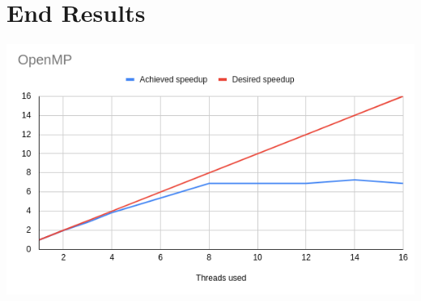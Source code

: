 \documentclass{report}
\begin{document}
\section{End Results}




\includegraphics[width=\textwidth]{openmp.png}




\end{document}

